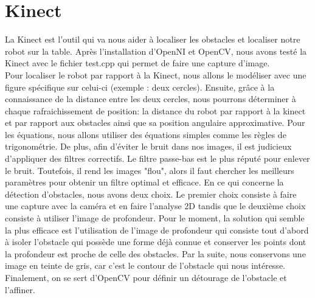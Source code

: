 \section{Kinect}
La Kinect est l’outil qui va nous aider à localiser les obstacles et localiser notre robot sur la table. Après l’installation d’OpenNI et OpenCV, nous avons testé la Kinect avec le fichier test.cpp qui permet de faire une capture d’image.\\
Pour localiser le robot par rapport à la Kinect, nous allons le modéliser avec une figure spécifique sur celui-ci (exemple : deux cercles). Ensuite, grâce à la connaissance de la distance entre les deux cercles, nous pourrons déterminer à chaque rafraichissement de position: la distance du robot par rapport à la kinect et par rapport aux obstacles ainsi que sa position angulaire approximative. Pour les équations, nous allons utiliser des équations simples comme les règles de trigonométrie. De plus, afin d'éviter le bruit dans nos images, il est judicieux d'appliquer des filtres correctifs. Le filtre passe-bas est le plus réputé pour enlever le bruit. Toutefois, il rend les images "flou", alors il faut chercher les meilleurs paramètres pour obtenir un filtre optimal et efficace. En ce qui concerne la détection d’obstacles, nous avons deux choix. Le premier choix consiste à faire une capture avec la caméra et en faire l’analyse 2D tandis que le deuxième choix consiste à utiliser l’image de profondeur. Pour le moment, la solution qui semble la plus efficace est l’utilisation de l’image de profondeur qui consiste tout d'abord à isoler l'obstacle qui possède une forme déjà connue et conserver les points dont la profondeur est proche de celle des obstacles. Par la suite, nous conservons une image en teinte de gris, car c'est le contour de l'obstacle qui nous intéresse. Finalement, on se sert d'OpenCV pour définir un détourage de l'obstacle et l'affiner. 

